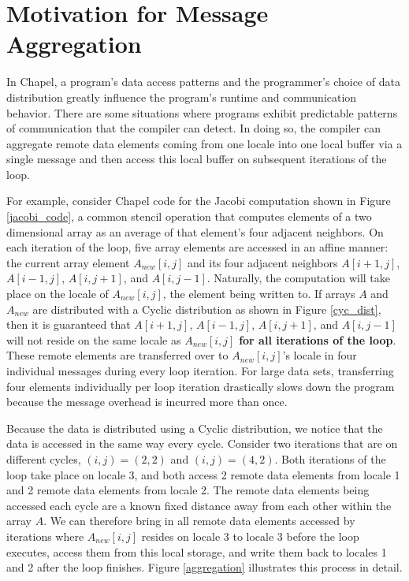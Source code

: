 \section{Motivation for Message Aggregation}\label{sec:motivation_for_aggregation} 

In Chapel, a program's data access patterns and the programmer's choice of data distribution greatly influence the program's runtime and communication behavior. There are some situations where programs exhibit predictable patterns of communication that the compiler can detect. In doing so, the compiler can aggregate remote data elements coming from one locale into one local buffer via a single message and then access this local buffer on subsequent iterations of the loop. 

For example, consider Chapel code for the Jacobi computation shown in Figure \ref{jacobi_code}, a common stencil operation that computes elements of a two dimensional array as an average of that element's four adjacent neighbors. On each iteration of the loop, five array elements are accessed in an affine manner: the current array element $A_{new}[i, j]$ and its four adjacent neighbors $A[i+1, j]$, $A[i-1, j]$, $A[i, j+1]$, and $A[i, j-1]$. Naturally, the computation will take place on the locale of $A_{new}[i, j]$, the element being written to. If arrays $A$ and $A_{new}$ are distributed with a Cyclic distribution as shown in Figure \ref{cyc_dist}, then it is guaranteed that $A[i+1, j]$, $A[i-1, j]$, $A[i, j+1]$, and $A[i, j-1]$ will not reside on the same locale as $A_{new}[i, j]$ \textbf{for all iterations of the loop}. These remote elements are transferred over to $A_{new}[i, j]$'s locale in four individual messages during every loop iteration. For large data sets, transferring four elements individually per loop iteration drastically slows down the program because the message overhead is incurred more than once. 

Because the data is distributed using a Cyclic distribution, we notice that the data is accessed in the same way every cycle. Consider two iterations that are on different cycles, $(i, j) = (2, 2)$ and $(i, j) = (4, 2)$. Both iterations of the loop take place on locale 3, and both access 2 remote data elements from locale 1 and 2 remote data elements from locale 2. The remote data elements being accessed each cycle are a known fixed distance away from each other within the array $A$. We can therefore bring in all remote data elements accessed by iterations where $A_{new}[i, j]$ resides on locale 3 to locale 3 before the loop executes, access them from this local storage, and write them back to locales 1 and 2 after the loop finishes. Figure \ref{aggregation} illustrates this process in detail. 

